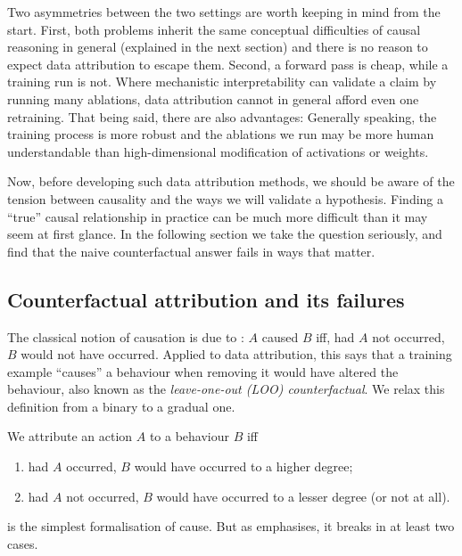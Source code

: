 \documentclass[11pt]{article}
\begin{document}
Two asymmetries between the two settings are worth keeping in mind from the start. First, both problems inherit the same conceptual difficulties of causal reasoning in general (explained in the next section) and there is no reason to expect data attribution to escape them. Second, a forward pass is cheap, while a training run is not. Where mechanistic interpretability can validate a claim by running many ablations, data attribution cannot in general afford even one retraining. That being said, there are also advantages: Generally speaking, the training process is more robust and the ablations we run may be more human understandable than high-dimensional modification of activations or weights.

Now, before developing such data attribution methods, we should be aware of the tension between causality and the ways we will validate a hypothesis. Finding a ``true'' causal relationship in practice can be much more difficult than it may seem at first glance.
In the following section we take the question seriously, and find that the naive counterfactual answer fails in ways that matter.


\subsection{Counterfactual attribution and its failures}\label{subsec:counterfactual}

The classical notion of causation is due to \citet{lewis1973causation}: $A$ caused $B$ iff, had $A$ not occurred, $B$ would not have occurred. Applied to data attribution, this says that a training example ``causes'' a behaviour when removing it would have altered the behaviour, also known as the \emph{leave-one-out (LOO) counterfactual}. We relax this definition from a binary to a gradual one.

\begin{definition}\label{def:counterfactual}
  We attribute an action $A$ to a behaviour $B$ iff
  \begin{enumerate}[label=(\roman*)]
    \item had $A$ occurred, $B$ would have occurred to a higher degree;
    \item had $A$ not occurred, $B$ would have occurred to a lesser degree (or not at all).
  \end{enumerate}
\end{definition}

 is the simplest formalisation of cause. But as \citet{mueller} emphasises, it breaks in at least two cases.
\end{document}
